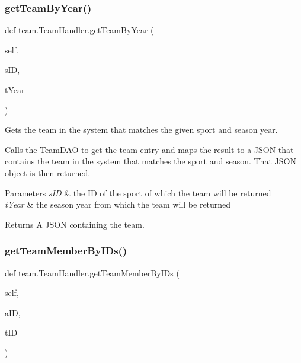 \subsubsection{\texorpdfstring{get\+Team\+By\+Year()}{getTeamByYear()}}
{\footnotesize\ttfamily def team.\+Team\+Handler.\+get\+Team\+By\+Year (\begin{DoxyParamCaption}\item[{}]{self,  }\item[{}]{s\+ID,  }\item[{}]{t\+Year }\end{DoxyParamCaption})}



Gets the team in the system that matches the given sport and season year. 

Calls the Team\+D\+AO to get the team entry and maps the result to a J\+S\+ON that contains the team in the system that matches the sport and season. That J\+S\+ON object is then returned.


\begin{DoxyParams}{Parameters}
{\em s\+ID} & the ID of the sport of which the team will be returned \\
\hline
{\em t\+Year} & the season year from which the team will be returned\\
\hline
\end{DoxyParams}
\begin{DoxyReturn}{Returns}
A J\+S\+ON containing the team. 
\end{DoxyReturn}
\mbox{\label{classteam_1_1_team_handler_a85091b1e4db82c9790eaf7f282aa526c}} 
\subsubsection{\texorpdfstring{get\+Team\+Member\+By\+I\+Ds()}{getTeamMemberByIDs()}}
{\footnotesize\ttfamily def team.\+Team\+Handler.\+get\+Team\+Member\+By\+I\+Ds (\begin{DoxyParamCaption}\item[{}]{self,  }\item[{}]{a\+ID,  }\item[{}]{t\+ID }\end{DoxyParamCaption})}



